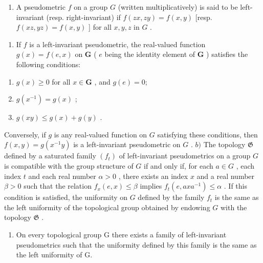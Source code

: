 \ExerciseSection

\begin{enumerate}
\def\labelenumi{\arabic{enumi})}
\tightlist
\item
  A pseudometric \(f\) on a group \(G\) (written multiplicatively) is said to be left-invariant (resp. right-invariant) if \(f(zx, zy) = f(x, y)\) {[}resp. \(f(xz, yz) = f(x, y)\) {]} for all \(x, y, z\) in \(G\) .
\end{enumerate}

\begin{enumerate}
\def\labelenumi{\alph{enumi})}
\tightlist
\item
  If \(f\) is a left-invariant pseudometric, the real-valued function \(g(x) = f(e, x)\) on \(\mathbf{G}\) ( \(e\) being the identity element of \(\mathbf{G}\) ) satisfies the following conditions:
\end{enumerate}

\begin{enumerate}
\def\labelenumi{(\roman{enumi})}
\item
  \(g(x)\geqslant \mathrm{0}\) for all \(x\in \mathbf{G}\) , and \(g(e) = \mathrm{0};\)
\item
  \(g(x^{-1}) = g(x)\) ;
\item
  \(g(xy) \leqslant g(x) + g(y)\) .
\end{enumerate}

Conversely, if \(g\) is any real-valued function on \(G\) satisfying these conditions, then \(f(x, y) = g(x^{-1}y)\) is a left-invariant pseudometric on \(G\) . \(b)\) The topology \(\mathfrak{G}\) defined by a saturated family \((f_t)\) of left-invariant pseudometrics on a group \(G\) is compatible with the group structure of \(G\) if and only if, for each \(a \in G\) , each index \(t\) and each real number \(\alpha > 0\) , there exists an index \(x\) and a real number \(\beta > 0\) such that the relation \(f_x(e, x) \leqslant \beta\) implies \(f_t(e, axa^{-1}) \leqslant \alpha\) . If this condition is satisfied, the uniformity on \(G\) defined by the family \(f_t\) is the same as the left uniformity of the topological group obtained by endowing \(G\) with the topology \(\mathfrak{G}\) .

\begin{enumerate}
\def\labelenumi{\alph{enumi})}
\setcounter{enumi}{2}
\tightlist
\item
  On every topological group G there exists a family of left-invariant pseudometrics such that the uniformity defined by this family is the same as the left uniformity of G.
\end{enumerate}

